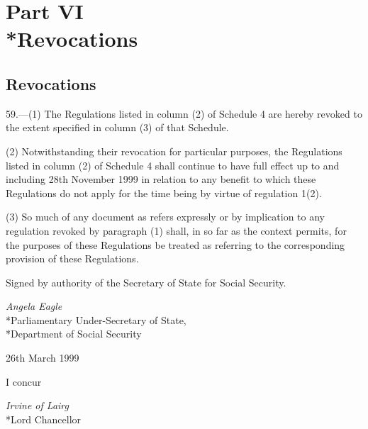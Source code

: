 \documentclass[12pt,a4paper]{article}
\begin{document}

\section[Part VI --- Revocations]{Part VI\\*Revocations}

\subsection[59. Revocations]{Revocations}

\renewcommand\parthead{--- Part VI}

59.—(1) The Regulations listed in column (2) of Schedule 4 are hereby revoked to the extent specified in column (3) of that Schedule.

(2) Notwithstanding their revocation for particular purposes, the Regulations listed in column (2) of Schedule 4 shall continue to have full effect up to and including 28th November 1999 in relation to any benefit to which these Regulations do not apply for the time being by virtue of regulation 1(2).

(3) So much of any document as refers expressly or by implication to any regulation revoked by paragraph (1) shall, in so far as the context permits, for the purposes of these Regulations be treated as referring to the corresponding provision of these Regulations.

\bigskip

Signed 
by authority of the Secretary of State for Social Security.

{\raggedleft
\emph{Angela Eagle}\\*Parliamentary Under-Secretary of State,\\*Department of Social Security

}

26th March 1999

\bigskip

I concur

{\raggedleft
\emph{Irvine of Lairg}\\*Lord Chancellor

}
\end{document}
